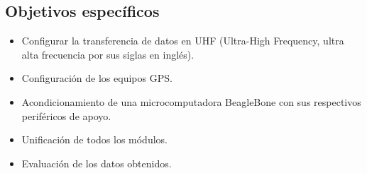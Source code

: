\subsection{Objetivos específicos}
\begin{itemize}
    \item Configurar la transferencia de datos en UHF (Ultra-High Frequency, ultra alta frecuencia por sus siglas en inglés).
    \item Configuración de los equipos GPS.
    \item Acondicionamiento de una microcomputadora BeagleBone con sus respectivos periféricos de apoyo.
    \item Unificación de todos los módulos.
	\item Evaluación de los datos obtenidos.    
\end{itemize}
